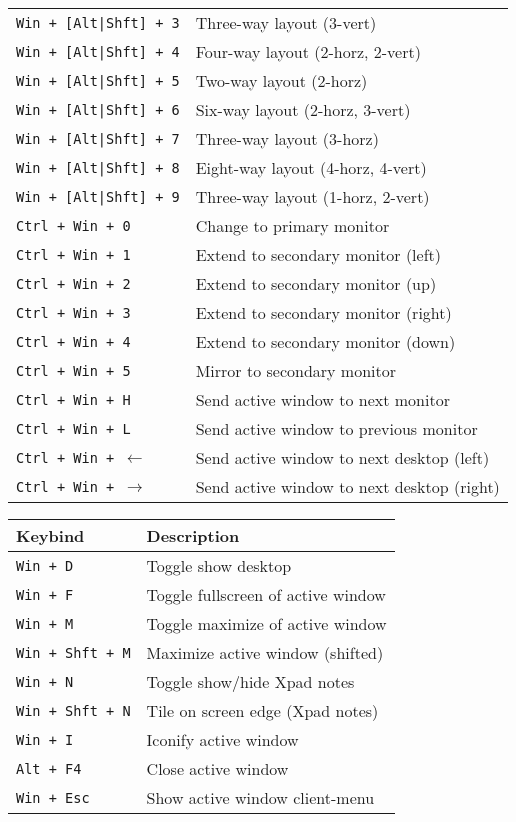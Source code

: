 \documentclass[letterpaper,12pt]{article}
\begin{document}
\begin{table}[H]
\begin{tabular}{|C{5cm}|L{10cm}|}
    {\tt Win + [Alt|Shft] + 3} & Three-way layout (3-vert) \\
    {\tt Win + [Alt|Shft] + 4} & Four-way layout (2-horz, 2-vert) \\
    {\tt Win + [Alt|Shft] + 5} & Two-way layout (2-horz) \\
    {\tt Win + [Alt|Shft] + 6} & Six-way layout (2-horz, 3-vert) \\
    {\tt Win + [Alt|Shft] + 7} & Three-way layout (3-horz) \\
    {\tt Win + [Alt|Shft] + 8} & Eight-way layout (4-horz, 4-vert) \\
    {\tt Win + [Alt|Shft] + 9} & Three-way layout (1-horz, 2-vert) \\
    \hline
    {\tt Ctrl + Win + 0} & Change to primary monitor \\
    {\tt Ctrl + Win + 1} & Extend to secondary monitor (left) \\
    {\tt Ctrl + Win + 2} & Extend to secondary monitor (up) \\
    {\tt Ctrl + Win + 3} & Extend to secondary monitor (right) \\
    {\tt Ctrl + Win + 4} & Extend to secondary monitor (down) \\
    {\tt Ctrl + Win + 5} & Mirror to secondary monitor \\
    {\tt Ctrl + Win + H} & Send active window to next monitor \\
    {\tt Ctrl + Win + L} & Send active window to previous monitor \\
    {\tt Ctrl + Win + $\leftarrow$} & Send active window to next desktop (left) \\
    {\tt Ctrl + Win + $\rightarrow$} & Send active window to next desktop (right) \\
    \hline
  \end{tabular}
\end{table}

\begin{table}[H]
  \begin{tabular}{|C{5cm}|L{10cm}|}
    \hline
    \textbf{Keybind} & \textbf{Description} \\
    \hline
    {\tt Win + D} & Toggle show desktop \\
    {\tt Win + F} & Toggle fullscreen of active window \\
    {\tt Win + M} & Toggle maximize of active window \\
    {\tt Win + Shft + M} & Maximize active window (shifted) \\
    {\tt Win + N} & Toggle show/hide Xpad notes \\
    {\tt Win + Shft + N} & Tile on screen edge (Xpad notes) \\
    {\tt Win + I} & Iconify active window \\
    {\tt Alt + F4} & Close active window \\
    {\tt Win + Esc} & Show active window client-menu \\
    \hline
  \end{tabular}
\end{table}
\end{document}
